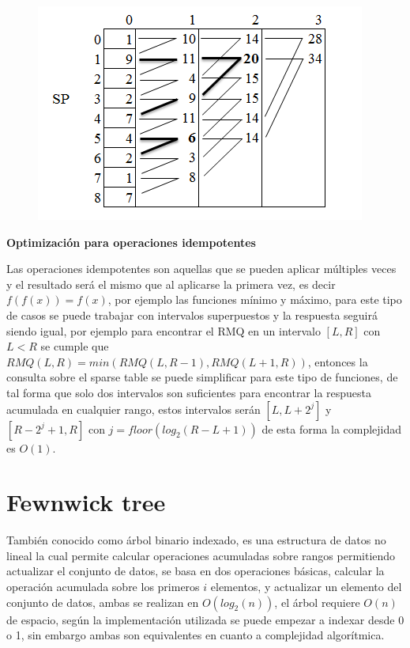 \documentclass[12pt, a4paper]{article}
\newcommand\cppfile[2][]{

}
\newcommand{\subtitulo}[1]{\begin{center}\textbf{#1}\end{center}}
\begin{document}
	\begin{figure}[!htb]
			\centering
			\includegraphics[scale=0.65]{Estructuras_de_datos/imagenes/sparse_table/consulta}
			\caption{}
			\label{estructuras:sparse_table:consulta}
		\endminipage
			\cppfile[19-27]{Estructuras_de_datos/codigos/sparse_table.cpp}
		\endminipage
	\end{figure}
	
	\subtitulo{Optimización para operaciones idempotentes}
	
	Las operaciones idempotentes son aquellas que se pueden aplicar múltiples veces y el resultado será el mismo que 
	al aplicarse la primera vez, es decir $f(f(x))=f(x)$, por ejemplo las funciones mínimo y máximo, para este tipo 
	de casos se puede trabajar con intervalos superpuestos y la respuesta seguirá siendo igual, por ejemplo para 
	encontrar el RMQ en un intervalo $[L,R]$ con $L < R$ se cumple que $RMQ(L,R) = min(RMQ(L,R-1), RMQ(L+1,R))$, 
	entonces la consulta sobre el sparse table se puede simplificar para este tipo de funciones, de tal forma que 
	solo dos intervalos son suficientes para encontrar la respuesta acumulada en cualquier rango, estos intervalos 
	serán $[L,L+2^j]$ y $[R-2^j+1,R]$ con $j = floor(log_{2}(R-L+1))$ de esta forma la complejidad es $O(1)$.
	\cppfile[29-32]{Estructuras_de_datos/codigos/sparse_table.cpp}

	\section{Fewnwick tree}
	\label{estructuras:fenwick_tree}
	
	También conocido como árbol binario indexado, es una estructura de datos no lineal la cual permite calcular 
	operaciones acumuladas sobre rangos permitiendo actualizar el conjunto de datos, se basa en dos operaciones básicas, 
	calcular la operación acumulada sobre los primeros $i$ elementos, y actualizar un elemento del conjunto de datos,
	ambas se realizan en $O(log_{2}(n))$, el árbol requiere $O(n)$ de espacio, según la implementación utilizada se 
	puede empezar a indexar desde 0 o 1, sin embargo ambas son equivalentes en cuanto a complejidad algorítmica.\\
	
\end{document}

